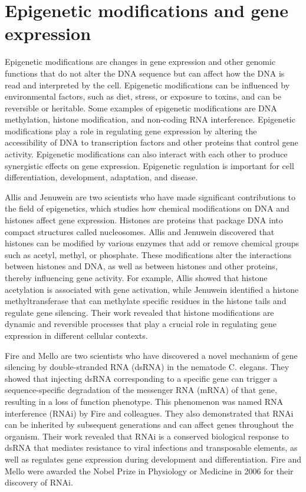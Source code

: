 \documentclass[sn-standardnature]{sn-jnl}%
\theoremstyle{thmstyleone}%
\theoremstyle{thmstyletwo}%
\theoremstyle{thmstylethree}%
\begin{document}
\section*{Epigenetic modifications and gene expression}\label{sec4}

Epigenetic modifications are changes in gene expression and other genomic functions that do not alter the DNA sequence but can affect how the DNA is read and interpreted by the cell. Epigenetic modifications can be influenced by environmental factors, such as diet, stress, or exposure to toxins, and can be reversible or heritable. Some examples of epigenetic modifications are DNA methylation, histone modification, and non-coding RNA interference. Epigenetic modifications play a role in regulating gene expression by altering the accessibility of DNA to transcription factors and other proteins that control gene activity. Epigenetic modifications can also interact with each other to produce synergistic effects on gene expression. Epigenetic regulation is important for cell differentiation, development, adaptation, and disease.

Allis and Jenuwein are two scientists who have made significant contributions to the field of epigenetics, which studies how chemical modifications on DNA and histones affect gene expression. Histones are proteins that package DNA into compact structures called nucleosomes. Allis and Jenuwein discovered that histones can be modified by various enzymes that add or remove chemical groups such as acetyl, methyl, or phosphate. These modifications alter the interactions between histones and DNA, as well as between histones and other proteins, thereby influencing gene activity. For example, Allis showed that histone acetylation is associated with gene activation, while Jenuwein identified a histone methyltransferase that can methylate specific residues in the histone tails and regulate gene silencing. Their work revealed that histone modifications are dynamic and reversible processes that play a crucial role in regulating gene expression in different cellular contexts.

Fire and Mello are two scientists who have discovered a novel mechanism of gene silencing by double-stranded RNA (dsRNA) in the nematode C. elegans. They showed that injecting dsRNA corresponding to a specific gene can trigger a sequence-specific degradation of the messenger RNA (mRNA) of that gene, resulting in a loss of function phenotype. This phenomenon was named RNA interference (RNAi) by Fire and colleagues. They also demonstrated that RNAi can be inherited by subsequent generations and can affect genes throughout the organism. Their work revealed that RNAi is a conserved biological response to dsRNA that mediates resistance to viral infections and transposable elements, as well as regulates gene expression during development and differentiation. Fire and Mello were awarded the Nobel Prize in Physiology or Medicine in 2006 for their discovery of RNAi.
\end{document}
